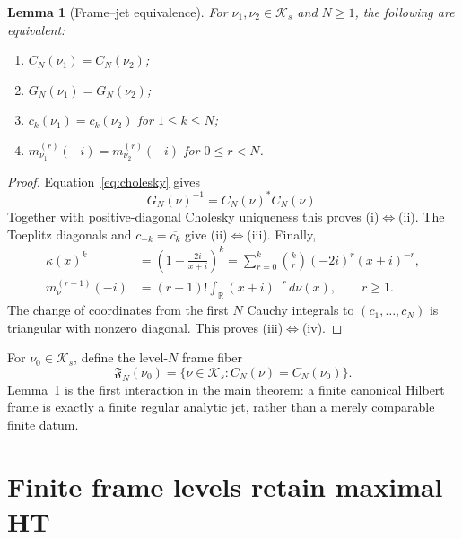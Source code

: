 \documentclass[11pt]{article}
\newtheorem{lemma}[theorem]{Lemma}
\newcommand{\R}{\mathbb R}
\newcommand{\cK}{\mathcal K}
\begin{document}
\begin{lemma}[Frame--jet equivalence]\label{lem:frame-jet}
For $\nu_1,\nu_2\in\cK_s$ and $N\geq1$, the following are equivalent:
\begin{enumerate}[label=\textup{(\roman*)},leftmargin=*]
  \item $C_N(\nu_1)=C_N(\nu_2)$;
  \item $G_N(\nu_1)=G_N(\nu_2)$;
  \item $c_k(\nu_1)=c_k(\nu_2)$ for $1\leq k\leq N$;
  \item $m_{\nu_1}^{(r)}(-i)=m_{\nu_2}^{(r)}(-i)$ for $0\leq r<N$.
\end{enumerate}
\end{lemma}

\begin{proof}
Equation~\eqref{eq:cholesky} gives
\begin{equation}\label{eq:gram-inverse}
  G_N(\nu)^{-1}=C_N(\nu)^*C_N(\nu).
\end{equation}
Together with positive-diagonal Cholesky uniqueness this proves (i)$\Leftrightarrow$(ii).
The Toeplitz diagonals and $c_{-k}=\overline{c_k}$ give
(ii)$\Leftrightarrow$(iii).  Finally,
\begin{align}
  \kappa(x)^k
    &=\left(1-\frac{2i}{x+i}\right)^k
      =\sum_{r=0}^k\binom{k}{r}(-2i)^r(x+i)^{-r},
      \label{eq:triangular-cayley}\\
  m_\nu^{(r-1)}(-i)
    &=(r-1)!\int_{\R}(x+i)^{-r}\,d\nu(x),\qquad r\geq1.
      \label{eq:cauchy-derivative}
\end{align}
The change of coordinates from the first $N$ Cauchy integrals to
$(c_1,\ldots,c_N)$ is triangular with nonzero diagonal.  This proves
(iii)$\Leftrightarrow$(iv).
\end{proof}

For $\nu_0\in\cK_s$, define the level-$N$ frame fiber
\begin{equation}\label{eq:frame-fiber}
  \mathfrak F_N(\nu_0)
  =\{\nu\in\cK_s:C_N(\nu)=C_N(\nu_0)\}.
\end{equation}
Lemma~\ref{lem:frame-jet} is the first interaction in the main theorem: a finite canonical Hilbert
frame is exactly a finite regular analytic jet, rather than a merely comparable finite datum.

\section{Finite frame levels retain maximal HT}\label{sec:aperture}
\end{document}
